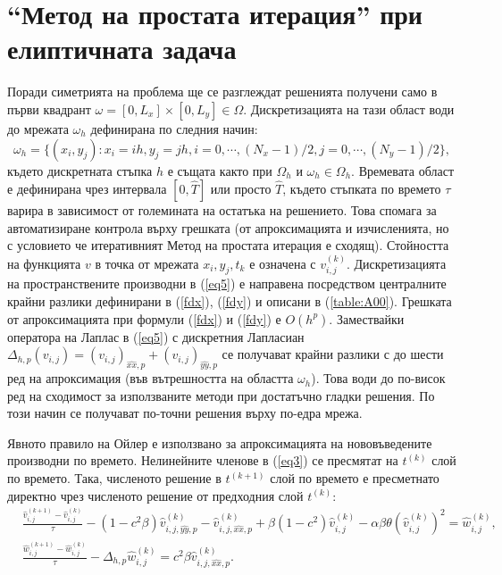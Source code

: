 \documentclass{article}
\newcommand{\rf}[1]{(\ref{#1})}
\begin{document}
\section{``Метод на простата итерация'' при елиптичната задача}
Поради симетрията на проблема ще се разглеждат решенията получени само в първи квадрант $\omega = [0,L_x] \times[0,L_y] \in \Omega$. Дискретизацията на тази област води до мрежата $\omega_h$ дефинирана по следния начин:
$$
\omega_h = \{(x_i,y_j): x_i = ih, y_j = jh, i = 0,\cdots ,(N_x-1)/2, j = 0,\cdots , (N_y-1)/2 \},
$$
където дискретната стъпка $h$ е същата както при $\Omega_h$ и $\omega_h \in \Omega_h$. Времевата област е дефинирана чрез интервала $[0, \widehat T]$ или просто $\widehat T$, където стъпката по времето $\tau$ варира в зависимост от големината на остатъка на решението. Това спомага за автоматизиране контрола върху грешката (от апроксимацията и изчисленията, но с условието че итеративният Метод на простата итерация е сходящ). Стойността на функцията $v$ в точка от мрежата $x_i,y_j,t_k$ е означена с $v_{i,j}^{(k)}$. 
Дискретизацията на пространствените производни в \rf{eq5} е направена посредством централните крайни разлики дефинирани в \rf{fdx}, \rf{fdy} и описани в \rf{table:A00}. Грешката от апроксимацията при формули \rf{fdx} и \rf{fdy} е $O(h^p)$. Замествайки оператора на Лаплас в \rf{eq5} с дискретния Лапласиан $\Delta_{h,p} (v_{i,j}) = (v_{i,j})_{\widehat{xx},p} + (v_{i,j})_{\widehat{yy},p}$ се получават крайни разлики с до шести ред на апроксимация (във вътрешността на областта $\omega_h$). Това води до по-висок ред на сходимост за използваните методи при достатъчно гладки решения. По този начин се получават по-точни решения върху по-едра мрежа. 
\par
Явното правило на Ойлер е използвано за апроксимацията на нововъведените производни по времето. Нелинейните членове в \rf{eq3} се пресмятат на $t^{(k)}$ слой по времето. Така, численото решение в $t^{(k+1)}$ слой по времето е пресметнато директно чрез численото решение от предходния слой $t^{(k)}$:
\begin{equation}\label{eq55}
\begin{split}
&\frac {\widehat{v}_{i,j}^{(k+1)}-\widehat{v}_{i,j}^{(k)}}{\tau}- (1-c^2 \beta) \widehat{v}_{i,j,{\widehat{yy},p}}^{(k)} - \widehat{v}_{i,j,{\widehat{xx},p}}^{(k)} + \beta (1-c^2 ) \widehat{v}_{i,j}^{(k)} - \alpha \beta \theta (\widehat{v}_{i,j}^{(k)})^2 = \widehat{w}_{i,j}^{(k)}, \\
&\frac  {\widehat{w}_{i,j}^{(k+1)} -\widehat{w}_{i,j}^{(k)}} {\tau} - \Delta_{h,p} \widehat{w}_{i,j}^{(k)} =  c^2 \beta \widehat{v}_{i,j,{\widehat{xx},p}}^{(k)}.
\end{split}
\end{equation}
\end{document}
